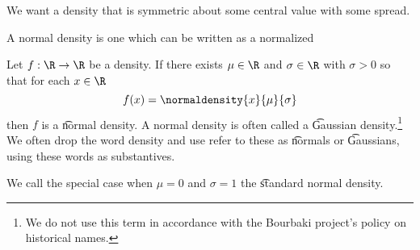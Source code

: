 

We want a density that is symmetric about some central value with some spread.


A normal density is one which can be written as a normalized

Let $f: \R \to \R$ be a density.
If there exists $\mu \in \R$ and $\sigma \in \R$ with $\sigma > 0$ so that for each $x \in \R$
\[
  f(x) = \normaldensity{x}{\mu}{\sigma}
\]
then $f$ is a \t{normal density}.
A normal density is often called a \t{Gaussian density}.\footnote{We do not use this term in accordance with the Bourbaki project's policy on historical names.}
We often drop the word density and use refer to these as \t{normals} or \t{Gaussians}, using these words as substantives.

We call the special case when $\mu = 0$ and $\sigma = 1$ the \t{standard normal density}.

\blankpage
